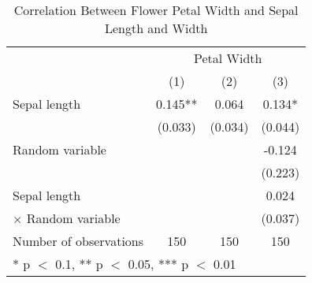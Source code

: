 \begin{table}[H]
\caption{Correlation Between Flower Petal Width and Sepal Length and Width} 
\label{tab:flower_table}
\centering
\begin{tabular}[t]{lccc}
\toprule
& \multicolumn{3}{c}{Petal Width} \\
  & (1) & (2) & (3)\\
\midrule
Sepal length & 0.145** & 0.064 & 0.134*\\
 & (0.033) & (0.034) & (0.044)\\[0.3cm]
Random variable &  &  & -0.124\\
 &  &  & (0.223)\\[0.3cm]
Sepal length &  &  & 0.024\\
 \quad $\times$ Random variable &  &  & (0.037)\\[0.3cm]
\midrule
Number of observations & 150 & 150 & 150\\
\bottomrule
\multicolumn{4}{l}{\rule{0pt}{1em}* p $<$ 0.1, ** p $<$ 0.05, *** p $<$ 0.01}\\
\end{tabular}
\end{table}
